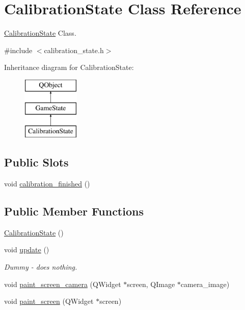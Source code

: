 \hypertarget{class_calibration_state}{\section{Calibration\-State Class Reference}
\label{class_calibration_state}
}


\hyperlink{class_calibration_state}{Calibration\-State} Class.  




{\ttfamily \#include $<$calibration\-\_\-state.\-h$>$}

Inheritance diagram for Calibration\-State\-:\begin{figure}[H]
\begin{center}
\leavevmode
\includegraphics[height=3.000000cm]{class_calibration_state}
\end{center}
\end{figure}
\subsection*{Public Slots}
\begin{DoxyCompactItemize}
\item 
void \hyperlink{class_calibration_state_a7e7f00dad5d771404d768e5e1f66e29a}{calibration\-\_\-finished} ()
\end{DoxyCompactItemize}
\subsection*{Public Member Functions}
\begin{DoxyCompactItemize}
\item 
\hyperlink{class_calibration_state_a616053b0e8a4fa575bfcac8d6389dcc4}{Calibration\-State} ()
\item 
\hypertarget{class_calibration_state_ab7464c22c3f9f2a4bd3acef00b513649}{void \hyperlink{class_calibration_state_ab7464c22c3f9f2a4bd3acef00b513649}{update} ()}\label{class_calibration_state_ab7464c22c3f9f2a4bd3acef00b513649}

\begin{DoxyCompactList}\small\item\em Dummy -\/ does nothing. \end{DoxyCompactList}\item 
void \hyperlink{class_calibration_state_a9fb1363a201716e66b5d61c041d37530}{paint\-\_\-screen\-\_\-camera} (Q\-Widget $\ast$screen, Q\-Image $\ast$camera\-\_\-image)
\item 
void \hyperlink{class_calibration_state_a6752cfc1ac103f9c7f6e60185e3d23a2}{paint\-\_\-screen} (Q\-Widget $\ast$screen)
\end{DoxyCompactItemize}
